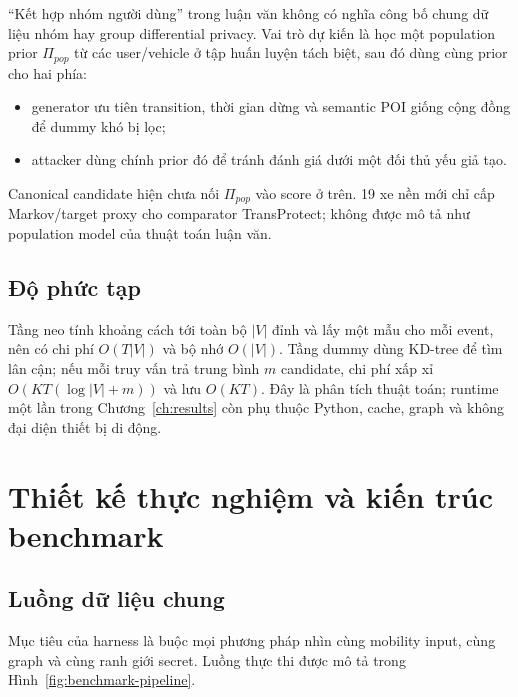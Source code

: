 \documentclass[12pt,a4paper,oneside]{report}
\begin{document}
``Kết hợp nhóm người dùng'' trong luận văn không có nghĩa công bố chung dữ liệu nhóm hay group differential privacy. Vai trò dự kiến là học một population prior $\Pi_{pop}$ từ các user/vehicle ở tập huấn luyện tách biệt, sau đó dùng cùng prior cho hai phía:

\begin{itemize}
  \item generator ưu tiên transition, thời gian dừng và semantic POI giống cộng đồng để dummy khó bị lọc;
  \item attacker dùng chính prior đó để tránh đánh giá dưới một đối thủ yếu giả tạo.
\end{itemize}

Canonical candidate hiện chưa nối $\Pi_{pop}$ vào score ở trên. 19 xe nền mới chỉ cấp Markov/target proxy cho comparator TransProtect; không được mô tả như population model của thuật toán luận văn.

\section{Độ phức tạp}

Tầng neo tính khoảng cách tới toàn bộ $|V|$ đỉnh và lấy một mẫu cho mỗi event, nên có chi phí $O(T|V|)$ và bộ nhớ $O(|V|)$. Tầng dummy dùng KD-tree để tìm lân cận; nếu mỗi truy vấn trả trung bình $m$ candidate, chi phí xấp xỉ $O(KT(\log|V|+m))$ và lưu $O(KT)$. Đây là phân tích thuật toán; runtime một lần trong Chương~\ref{ch:results} còn phụ thuộc Python, cache, graph và không đại diện thiết bị di động.

\chapter{Thiết kế thực nghiệm và kiến trúc benchmark}
\label{ch:experiment}

\section{Luồng dữ liệu chung}

Mục tiêu của harness là buộc mọi phương pháp nhìn cùng mobility input, cùng graph và cùng ranh giới secret. Luồng thực thi được mô tả trong Hình~\ref{fig:benchmark-pipeline}.
\end{document}
